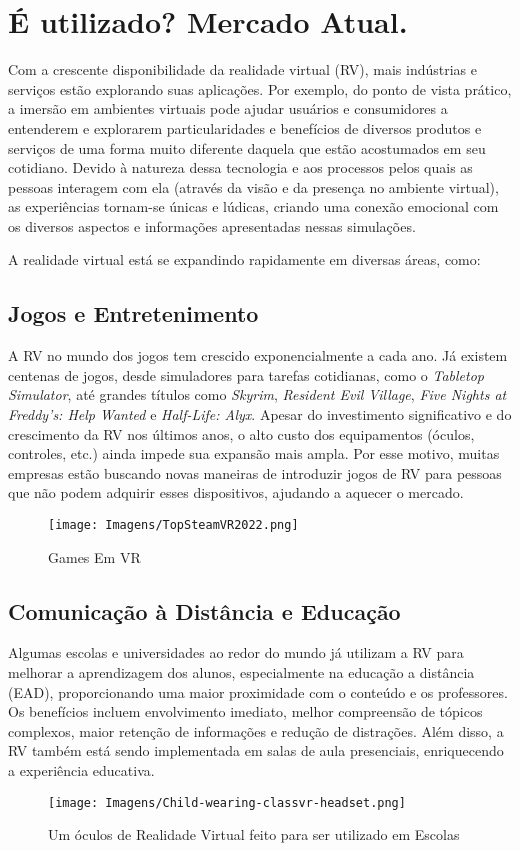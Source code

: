\documentclass[article,a4paper,12pt,brazil,sumario=tradicional]{abntex2}
\begin{document}
\section{É utilizado? Mercado Atual.}

Com a crescente disponibilidade da realidade virtual (RV), mais indústrias e serviços estão explorando suas aplicações. Por exemplo, do ponto de vista prático, a imersão em ambientes virtuais pode ajudar usuários e consumidores a entenderem e explorarem particularidades e benefícios de diversos produtos e serviços de uma forma muito diferente daquela que estão acostumados em seu cotidiano. Devido à natureza dessa tecnologia e aos processos pelos quais as pessoas interagem com ela (através da visão e da presença no ambiente virtual), as experiências tornam-se únicas e lúdicas, criando uma conexão emocional com os diversos aspectos e informações apresentadas nessas simulações.

A realidade virtual está se expandindo rapidamente em diversas áreas, como:

\subsection{Jogos e Entretenimento}
A RV no mundo dos jogos tem crescido exponencialmente a cada ano. Já existem centenas de jogos, desde simuladores para tarefas cotidianas, como o \textit{Tabletop Simulator}, até grandes títulos como \textit{Skyrim}, \textit{Resident Evil Village}, \textit{Five Nights at Freddy's: Help Wanted} e \textit{Half-Life: Alyx}. Apesar do investimento significativo e do crescimento da RV nos últimos anos, o alto custo dos equipamentos (óculos, controles, etc.) ainda impede sua expansão mais ampla. Por esse motivo, muitas empresas estão buscando novas maneiras de introduzir jogos de RV para pessoas que não podem adquirir esses dispositivos, ajudando a aquecer o mercado.
\begin{figure}[H]
    \centering
    \texttt{[image: Imagens/TopSteamVR2022.png]}
    \caption{Games Em VR}
    \label{fig:enter-label}
\end{figure}
\subsection{Comunicação à Distância e Educação}
Algumas escolas e universidades ao redor do mundo já utilizam a RV para melhorar a aprendizagem dos alunos, especialmente na educação a distância (EAD), proporcionando uma maior proximidade com o conteúdo e os professores. Os benefícios incluem envolvimento imediato, melhor compreensão de tópicos complexos, maior retenção de informações e redução de distrações. Além disso, a RV também está sendo implementada em salas de aula presenciais, enriquecendo a experiência educativa.
\begin{figure}[H]
    \centering
    \texttt{[image: Imagens/Child-wearing-classvr-headset.png]}
    \caption{Um óculos de Realidade Virtual feito para ser utilizado em Escolas}
    \label{fig:enter-label}
\end{figure}
\end{document}
